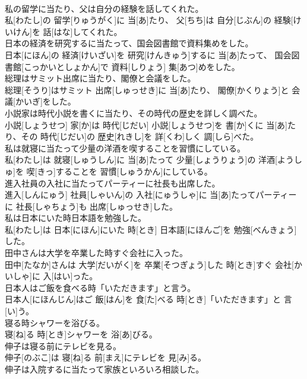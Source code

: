 \documentclass[8pt]{extreport}
\begin{document}
\begin{CJK}{UTF8}{min}
\\	私の留学に当たり、父は自分の経験を話してくれた。	
\\	私[わたし]の 留学[りゅうがく]に 当[あ]たり、 父[ちち]は 自分[じぶん]の 経験[けいけん]を 話[はな]してくれた。
\\	日本の経済を研究するに当たって、国会図書館で資料集めをした。	
\\	日本[にほん]の 経済[けいざい]を 研究[けんきゅう]するに 当[あ]たって、 国会図書館[こっかいとしょかん]で 資料[しりょう] 集[あつ]めをした。
\\	総理はサミット出席に当たり、閣僚と会議をした。	
\\	総理[そうり]はサミット 出席[しゅっせき]に 当[あ]たり、 閣僚[かくりょう]と 会議[かいぎ]をした。
\\	小説家は時代小説を書くに当たり、その時代の歴史を詳しく調べた。	
\\	小説[しょうせつ] 家[か]は 時代[じだい] 小説[しょうせつ]を 書[か]くに 当[あ]たり、その 時代[じだい]の 歴史[れきし]を 詳[くわ]しく 調[しら]べた。
\\	私は就寝に当たって少量の洋酒を喫することを習慣にしている。	
\\	私[わたし]は 就寝[しゅうしん]に 当[あ]たって 少量[しょうりょう]の 洋酒[ようしゅ]を 喫[きっ]することを 習慣[しゅうかん]にしている。
\\	進入社員の入社に当たってパーティーに社長も出席した。	
\\	進入[しんにゅう] 社員[しゃいん]の 入社[にゅうしゃ]に 当[あ]たってパーティーに 社長[しゃちょう]も 出席[しゅっせき]した。
\\	私は日本にいた時日本語を勉強した。	
\\	私[わたし]は 日本[にほん]にいた 時[とき] 日本語[にほんご]を 勉強[べんきょう]した。
\\	田中さんは大学を卒業した時すぐ会社に入った。	
\\	田中[たなか]さんは 大学[だいがく]を 卒業[そつぎょう]した 時[とき]すぐ 会社[かいしゃ]に 入[はい]った。
\\	日本人はご飯を食べる時「いただきます」と言う。	
\\	日本人[にほんじん]はご 飯[はん]を 食[た]べる 時[とき]「いただきます」と 言[い]う。
\\	寝る時シャワーを浴びる。	
\\	寝[ね]る 時[とき]シャワーを 浴[あ]びる。
\\	伸子は寝る前にテレビを見る。	
\\	伸子[のぶこ]は 寝[ね]る 前[まえ]にテレビを 見[み]る。
\\	伸子は入院するに当たって家族といろいろ相談した。	

\end{CJK}
\end{document}
